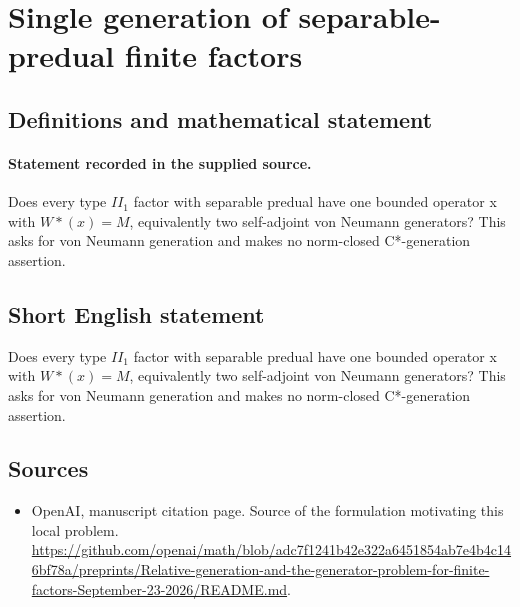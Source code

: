 \documentclass[11pt]{article}
\begin{document}
\section*{Single generation of separable-predual finite factors}\label{30007300}
\subsection{Definitions and mathematical statement}
\paragraph{Statement recorded in the supplied source.}
Does every type $II_{1}$ factor with separable predual have one bounded operator x with $W*(x)=M$, equivalently two self-adjoint von Neumann generators? This asks for von Neumann generation and makes no norm-closed C*-generation assertion.
\subsection{Short English statement}
Does every type $II_{1}$ factor with separable predual have one bounded operator x with $W*(x)=M$, equivalently two self-adjoint von Neumann generators? This asks for von Neumann generation and makes no norm-closed C*-generation assertion.
\subsection{Sources}
\begin{itemize}
\item[S1] OpenAI, manuscript citation page. Source of the formulation motivating this local problem.
\url{https://github.com/openai/math/blob/adc7f1241b42e322a6451854ab7e4b4c146bf78a/preprints/Relative-generation-and-the-generator-problem-for-finite-factors-September-23-2026/README.md}.
\end{itemize}
\end{document}
